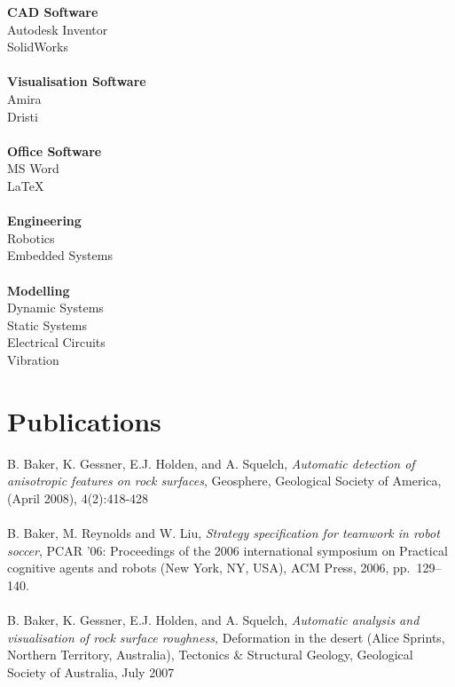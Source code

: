 \documentclass[10pt, a4paper]{report}
\begin{document}
\begin{minipage}[t]{12em}
\begin{flushright}
{{\bf CAD Software} \\
Autodesk Inventor \\
SolidWorks \\

~\\

{\bf Visualisation Software} \\
Amira \\
Dristi \\

~\\

{\bf Office Software} \\
MS Word \\
\LaTeX \\

~\\

{\bf Engineering} \\
Robotics \\
Embedded Systems \\

~\\


{\bf Modelling} \\
Dynamic Systems \\
Static Systems \\
Electrical Circuits \\
Vibration \\
}

\end{flushright}
\end{minipage} 

\newpage


\section*{Publications}
B. Baker, K. Gessner, E.J. Holden, and A. Squelch,  \emph{Automatic detection of anisotropic features on
rock surfaces}, Geosphere, Geological Society of America, (April 2008), 4(2):418-428\\
\\
B. Baker, M. Reynolds and W. Liu, \emph{Strategy specification for
  teamwork in robot soccer}, PCAR '06: Proceedings of the 2006 international
  symposium on Practical cognitive agents and robots (New York, NY, USA), ACM
  Press, 2006, pp.~129--140.\\
  \\
B. Baker, K. Gessner, E.J. Holden, and A. Squelch, \emph{Automatic analysis and 
visualisation of rock surface roughness,} Deformation in the desert (Alice Sprints, Northern 
Territory, Australia), Tectonics \& Structural Geology, Geological Society of Australia, July 
2007
\end{document}
